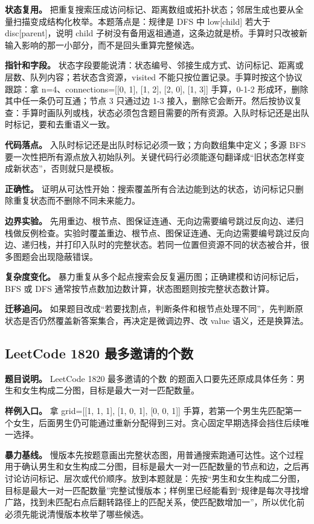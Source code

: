 \textbf{状态复用。} 把重复搜索压成访问标记、距离数组或拓扑状态；邻居生成也要从全量扫描变成结构化枚举。本题落点是：规律是 DFS 中 low[child] 若大于 disc[parent]，说明 child 子树没有备用返祖通道，这条边就是桥。手算时只改被新输入影响的那一小部分，而不是回头重算完整候选。

\textbf{指针和字段。} 状态字段要能说清：状态编号、邻接生成方式、访问标记、距离或层数、队列内容；若状态含资源，visited 不能只按位置记录。手算时按这个协议跟踪：拿 n=4、connections=[[0, 1], [1, 2], [2, 0], [1, 3]] 手算，0-1-2 形成环，删除其中任一条仍可互通；节点 3 只通过边 1-3 接入，删除它会断开。然后按协议复查：手算时画队列或栈，状态必须包含题目需要的所有资源。入队时标记还是出队时标记，要和去重语义一致。

\textbf{代码落点。} 入队时标记还是出队时标记必须一致；方向数组集中定义；多源 BFS 要一次性把所有源点放入初始队列。关键代码行必须能逐句翻译成“旧状态怎样变成新状态”，否则就只是模板。

\textbf{正确性。} 证明从可达性开始：搜索覆盖所有合法边能到达的状态，访问标记只删除重复状态而不删除不同未来能力。

\textbf{边界实验。} 先用重边、根节点、图保证连通、无向边需要编号跳过反向边、递归栈做反例检查。实验时覆盖重边、根节点、图保证连通、无向边需要编号跳过反向边、递归栈，并打印入队时的完整状态。若同一位置但资源不同的状态被合并，很多图题会出现隐蔽错误。

\textbf{复杂度变化。} 暴力重复从多个起点搜索会反复遍历图；正确建模和访问标记后，BFS 或 DFS 通常按节点数加边数计算，状态图题则按完整状态数计算。

\textbf{迁移追问。} 如果题目改成“若要找割点，判断条件和根节点处理不同”，先判断原状态是否仍然覆盖新答案集合，再决定是微调边界、改 value 语义，还是换算法。

\subsection{LeetCode 1820 最多邀请的个数}

\textbf{题目说明。} LeetCode 1820 最多邀请的个数 的题面入口要先还原成具体任务：男生和女生构成二分图，目标是最大一对一匹配数量。

\textbf{样例入口。} 拿 grid=[[1, 1, 1], [1, 0, 1], [0, 0, 1]] 手算，若第一个男生先匹配第一个女生，后面男生仍可能通过重新分配得到三对。贪心固定早期选择会挡住后续唯一选择。

\textbf{暴力基线。} 慢版本先按题意画出完整状态图，用普通搜索跑通可达性。这个过程用于确认男生和女生构成二分图，目标是最大一对一匹配数量的节点和边，之后再讨论访问标记、层次或代价顺序。放到本题就是：先按“男生和女生构成二分图，目标是最大一对一匹配数量”完整试慢版本；样例里已经能看到“规律是每次寻找增广路，找到未匹配右点后翻转路径上的匹配关系，使匹配数增加一”，所以优化前必须先能说清慢版本枚举了哪些候选。

